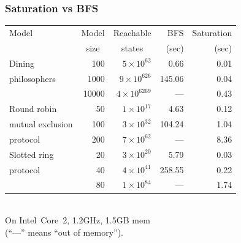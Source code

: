 \documentclass{beamer}
\begin{document}
\begin{frame}
  \frametitle{Saturation vs BFS}

  \vspace{-3.7mm}
  \begin{center}
    \begin{tabular}{|l|r||r||r|r|}
      \hline
      {\footnotesize Model} & \multicolumn{1}{|c||}{\footnotesize Model} & \multicolumn{1}{c||}{\footnotesize Reachable} & {\footnotesize BFS} & {\footnotesize Saturation} \\
      & \multicolumn{1}{|c||}{\footnotesize size}  & \multicolumn{1}{c||}{\footnotesize states}  & {\footnotesize (sec)} & {\footnotesize (sec)} \\
      \hline
      \hline
      {\footnotesize Dining} & 100 & $5\times10^{62}$ &   0.66 &    0.01 \\
      {\footnotesize philosophers} & 1000 & $9\times10^{626}$ & 145.06 &    0.04 \\
      & 10000 & $4\times10^{6269}$ &   --- &   0.43 \\
      \hline
      \hline
      {\footnotesize Round robin} & 50 & $1\times10^{17}$ &    4.63 &    0.12 \\
      {\footnotesize mutual exclusion} & 100 & $3\times10^{32}$ &   104.24 &    1.04 \\
      {\footnotesize protocol} & 200 & $7\times10^{62}$ &   --- &   8.36 \\
      \hline
      \hline
      {\footnotesize Slotted ring} & 20 & $3\times10^{20}$   &  5.79 &    0.03 \\
      {\footnotesize protocol}     & 40 & $4\times10^{41}$  &   258.55 &    0.22 \\
      {\footnotesize}             & 80 & $1\times10^{84}$ &   --- &  1.74 \\
      \hline
    \end{tabular}\\
    On Intel~Core~2, 1.2GHz, 1.5GB mem\\(``---'' means ``out of memory'').
  \end{center}

\end{frame}
\end{document}
